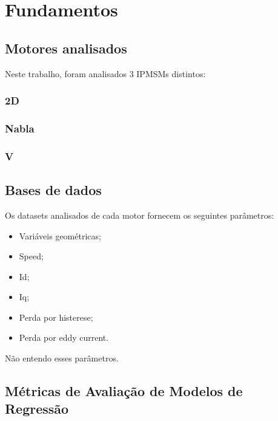 \documentclass{article}
\begin{document}
\section{Fundamentos}



\subsection{Motores analisados}

Neste trabalho, foram analisados 3 IPMSMs distintos:

\subsubsection{2D}


\subsubsection{Nabla}


\subsubsection{V}

\subsection{Bases de dados}

\noindent Os datasets analisados de cada motor fornecem os seguintes parâmetros:

\begin{itemize}
    \item Variáveis geométricas;
    \item Speed;
    \item Id;
    \item Iq;
    \item Perda por histerese;
    \item Perda por eddy current.
\end{itemize}

Não entendo esses parâmetros.

\newpage


\subsection{Métricas de Avaliação de Modelos de Regressão}
\end{document}

